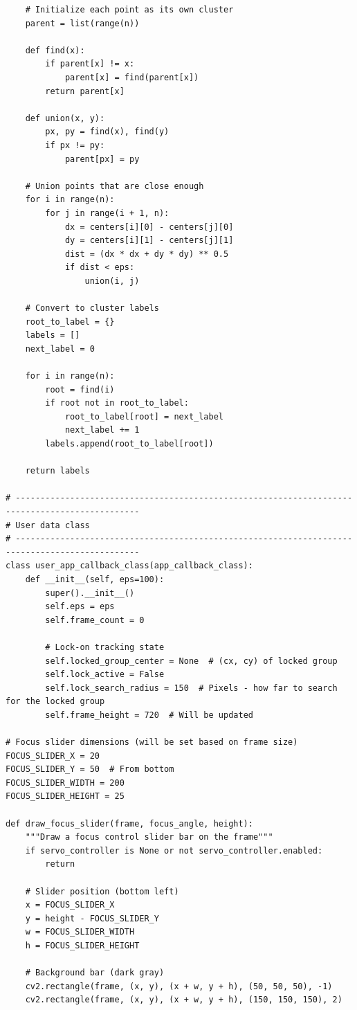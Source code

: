 \documentclass[11pt,a4paper]{article}
\begin{document}
\begin{lstlisting}
    # Initialize each point as its own cluster
    parent = list(range(n))
    
    def find(x):
        if parent[x] != x:
            parent[x] = find(parent[x])
        return parent[x]
    
    def union(x, y):
        px, py = find(x), find(y)
        if px != py:
            parent[px] = py
    
    # Union points that are close enough
    for i in range(n):
        for j in range(i + 1, n):
            dx = centers[i][0] - centers[j][0]
            dy = centers[i][1] - centers[j][1]
            dist = (dx * dx + dy * dy) ** 0.5
            if dist < eps:
                union(i, j)
    
    # Convert to cluster labels
    root_to_label = {}
    labels = []
    next_label = 0
    
    for i in range(n):
        root = find(i)
        if root not in root_to_label:
            root_to_label[root] = next_label
            next_label += 1
        labels.append(root_to_label[root])
    
    return labels

# -----------------------------------------------------------------------------------------------
# User data class
# -----------------------------------------------------------------------------------------------
class user_app_callback_class(app_callback_class):
    def __init__(self, eps=100):
        super().__init__()
        self.eps = eps
        self.frame_count = 0
        
        # Lock-on tracking state
        self.locked_group_center = None  # (cx, cy) of locked group
        self.lock_active = False
        self.lock_search_radius = 150  # Pixels - how far to search for the locked group
        self.frame_height = 720  # Will be updated

# Focus slider dimensions (will be set based on frame size)
FOCUS_SLIDER_X = 20
FOCUS_SLIDER_Y = 50  # From bottom
FOCUS_SLIDER_WIDTH = 200
FOCUS_SLIDER_HEIGHT = 25

def draw_focus_slider(frame, focus_angle, height):
    """Draw a focus control slider bar on the frame"""
    if servo_controller is None or not servo_controller.enabled:
        return
    
    # Slider position (bottom left)
    x = FOCUS_SLIDER_X
    y = height - FOCUS_SLIDER_Y
    w = FOCUS_SLIDER_WIDTH
    h = FOCUS_SLIDER_HEIGHT
    
    # Background bar (dark gray)
    cv2.rectangle(frame, (x, y), (x + w, y + h), (50, 50, 50), -1)
    cv2.rectangle(frame, (x, y), (x + w, y + h), (150, 150, 150), 2)
    

\end{lstlisting}
\end{document}

